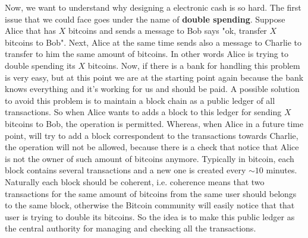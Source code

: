 Now, we want to understand why designing a electronic cash is so hard. The first issue that we could face goes under the name of \textbf{double spending}. Suppose Alice that has $X$ bitcoins and sends a message to Bob says "ok, transfer $X$ bitcoins to Bob". Next, Alice at the same time sends also a message to Charlie to transfer to him the same amount of bitcoins. In other words Alice is trying to double spending its $X$ bitcoins. Now, if there is a bank for handling this problem is very easy, but at this point we are at the starting point again because the bank knows everything and it's working for us and should be paid. A possible solution to avoid this problem is to maintain a block chain as a public ledger of all transactions. So when Alice wants to adds a block to this ledger for sending $X$ bitcoins to Bob, the operation is permitted. Whereas, when Alice in a future time point, will try to add a block correspondent to the transactions towards Charlie, the operation will not be allowed, because there is a check that notice that Alice is not the owner of such amount of bitcoins anymore. Typically in bitcoin, each block contains several transactions and a new one is created every $\sim 10$ minutes. Naturally each block should be coherent, i.e. coherence means that two transactions for the same amount of bitcoins from the same user should belongs to the same block, otherwise the Bitcoin community will easily notice that that user is trying to double its bitcoins. So the idea is to make this public ledger as the central authority for managing and checking all the transactions. 